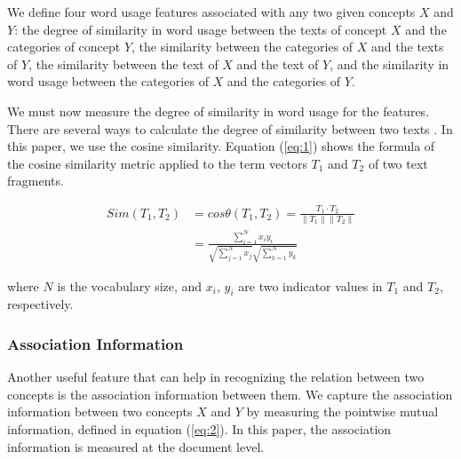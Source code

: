 We define four word usage features associated with any two given
concepts $X$ and $Y$: the degree of similarity in word usage between
the texts of concept $X$ and the categories of concept $Y$, the
similarity between the categories of $X$ and the texts of $Y$, the
similarity between the text of $X$ and the text of $Y$, and the
similarity in word usage between the categories of $X$ and the
categories of $Y$.

We must now measure the degree of similarity in word usage for the
features. There are several ways to calculate the degree of similarity
between two texts \cite{mohler-mihalcea:2009:EACL}. In this paper, we
use the cosine similarity. Equation (\ref{eq:1}) shows the formula
of the cosine similarity metric applied to the term vectors $T_1$ and
$T_2$ of two text fragments.

\begin{align}
\label{eq:1}
     Sim(T_1, T_2) & = cos \theta(T_1, T_2) = \frac{T_1 \cdot T_2}{\left\| T_1 \right\| \left\| T_2 \right\|} \nonumber \\ 
                   & = \frac{\sum_{i=1}^{N}x_iy_i}{\sqrt{\sum_{j=1}^{N}x_j} \sqrt{\sum_{k=1}^{N}y_k}}  
\end{align}


where $N$ is the vocabulary size, and $x_i$, $y_i$ are two indicator
values in $T_1$ and $T_2$, respectively.

\subsubsection{Association Information}
Another useful feature that can help in recognizing the relation between
two concepts is the association information between them.
We capture the association information between two concepts $X$ and
$Y$ by measuring the pointwise mutual information, defined in equation
(\ref{eq:2}). In this paper, the association information is measured
at the document level.

